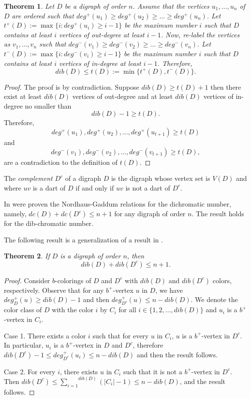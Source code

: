 \documentclass[12pt]{article}
\newtheorem{theorem}{Theorem}
\begin{document}
\begin{theorem}\label{teo1}
Let $D$ be a digraph of order $n$. Assume that the vertices $u_1,\dots ,u_n$ of $D$ are ordered such that $deg^+(u_1)\geq deg^+(u_2) \geq \dots \geq deg^+(u_n)$. Let $t^+(D) := \max \{i \colon deg^+(u_i) \geq i-1\}$ be the maximum number $i$ such that $D$ contains at least $i$ vertices of out-degree at least $i-1$. Now, re-label the vertices as $v_1,\dots ,v_n$ such that $deg^-(v_1)\geq deg^-(v_2) \geq \dots \geq deg^-(v_n)$. Let $t^-(D) := \max \{i \colon deg^-(v_i) \geq i-1\}$ be the maximum number $i$ such that $D$ contains at least $i$ vertices of in-degree at least $i-1$. Therefore, \[dib(D) \leq t(D):=\min\{t^+(D),t^-(D)\}.\]
\end{theorem}
\begin{proof}
The proof is by contradiction. Suppose $dib(D)\geq t(D)+1$ then there exist at least $dib(D)$ vertices of out-degree and at least $dib(D)$ vertices of in-degree no smaller than \[dib(D)-1\geq t(D).\]
Therefore, \[deg^+(u_1),deg^+(u_2),\dots,deg^+(u_{t+1})\geq t(D)\] and \[deg^-(v_1),deg^-(v_2),\dots,deg^-(v_{t+1})\geq t(D),\] are a contradiction to the definition of $t(D)$.
\end{proof}

The \textit{complement} $D^c$ of a digraph $D$ is the digraph whose vertex set is $V(D)$ and where $uv$ is a dart of $D$ if and only if $uv$ is not a dart of $D^c$.

In \cite{MR3875016,MR4426060} were proven the Nordhaus-Gaddum relations for the dichromatic number, namely, $dc(D)+dc(D^c)\leq n+1$ for any digraph of order $n$. The result holds for the dib-chromatic number.

The following result is a generalization of a result in \cite{MR1927071}.

\begin{theorem}\label{teo2}
If $D$ is a digraph of order $n$, then
\[dib(D)+dib(D^c)\leq n+1.\]
\end{theorem}
\begin{proof}
Consider $b$-colorings of $D$ and $D^c$ with $dib(D)$ and $dib(D^c)$ colors, respectively. Observe that for any $b^+$-vertex $u$ in $D$, we have $deg^+_D(u)\geq dib(D)-1$ and then $deg^+_{D^c}(u)\leq n-dib(D)$. We denote the color class of $D$ with the color $i$ by $C_i$ for all $i\in\{1,2,\dots,dib(D)\}$ and $u_i$ is a $b^+$-vertex in $C_i$.

Case 1. There exists a color $i$ such that for every $u$ in $C_i$, $u$ is a $b^+$-vertex in $D^c$. In particular, $u_i$ is a $b^+$-vertex in $D$ and $D^c$, therefore $dib(D^c)-1\leq deg^+_{D^c}(u_i)\leq n-dib(D)$ and then the result follows.

Case 2. For every $i$, there exists $u$ in $C_i$ such that it is not a $b^+$-vertex in $D^c$. Then $dib(D^c)\leq\overset{dib(D)}{\underset{i=1}{\sum}}(|C_i|-1)\leq n-dib(D)$, and the result follows.
\end{proof}
\end{document}
